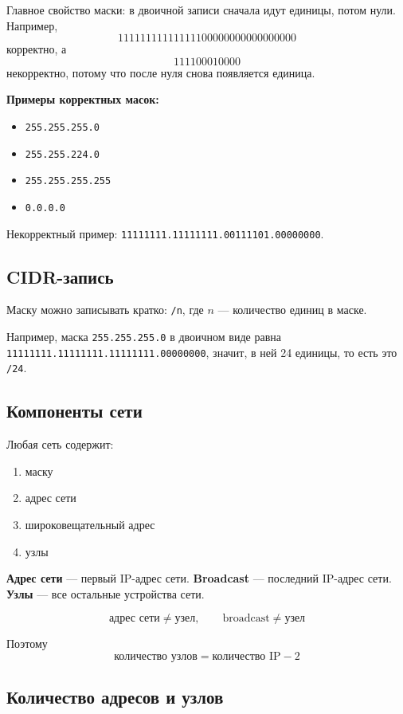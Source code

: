 \documentclass[11pt]{article}
\begin{document}
Главное свойство маски: в двоичной записи сначала идут единицы, потом нули. Например,
\[
11111111111111100000000000000000
\]
корректно, а
\[
111100010000
\]
некорректно, потому что после нуля снова появляется единица.

\textbf{Примеры корректных масок:}
\begin{itemize}
  \item \texttt{255.255.255.0}
  \item \texttt{255.255.224.0}
  \item \texttt{255.255.255.255}
  \item \texttt{0.0.0.0}
\end{itemize}

Некорректный пример: \texttt{11111111.11111111.00111101.00000000}.

\subsection*{CIDR-запись}

Маску можно записывать кратко: \texttt{/n}, где $n$ --- количество единиц в маске.

Например, маска \texttt{255.255.255.0} в двоичном виде равна \texttt{11111111.11111111.11111111.00000000}, значит, в ней 24 единицы, то есть это \texttt{/24}.

\subsection*{Компоненты сети}

Любая сеть содержит:
\begin{enumerate}
  \item маску
  \item адрес сети
  \item широковещательный адрес
  \item узлы
\end{enumerate}

\textbf{Адрес сети} --- первый IP-адрес сети. \textbf{Broadcast} --- последний IP-адрес сети. \textbf{Узлы} --- все остальные устройства сети.

\[
\text{адрес сети} \neq \text{узел}, \qquad \text{broadcast} \neq \text{узел}
\]

Поэтому
\[
\text{количество узлов} = \text{количество IP} - 2
\]

\subsection*{Количество адресов и узлов}
\end{document}
